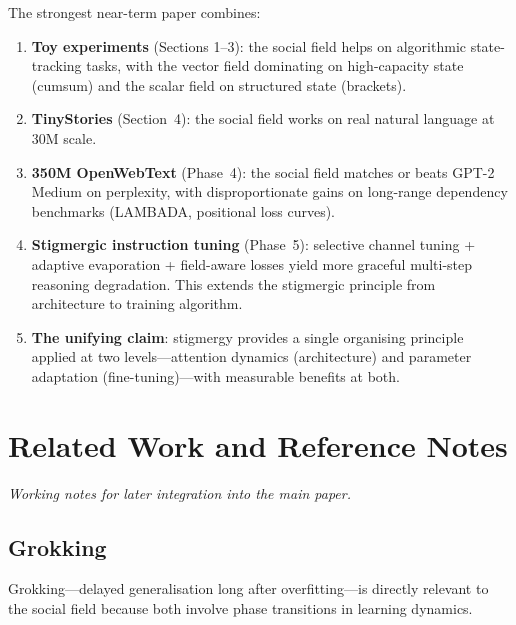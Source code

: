 \documentclass[11pt,a4paper]{article}
\begin{document}
The strongest near-term paper combines:
\begin{enumerate}
    \item \textbf{Toy experiments} (Sections 1--3): the social field
          helps on algorithmic state-tracking tasks, with the vector
          field dominating on high-capacity state (cumsum) and the
          scalar field on structured state (brackets).
    \item \textbf{TinyStories} (Section~4): the social field works on
          real natural language at 30M scale.
    \item \textbf{350M OpenWebText} (Phase~4): the social field
          matches or beats GPT-2 Medium on perplexity, with
          disproportionate gains on long-range dependency benchmarks
          (LAMBADA, positional loss curves).
    \item \textbf{Stigmergic instruction tuning} (Phase~5): selective
          channel tuning + adaptive evaporation + field-aware losses
          yield more graceful multi-step reasoning degradation.  This
          extends the stigmergic principle from architecture to
          training algorithm.
    \item \textbf{The unifying claim}: stigmergy provides a single
          organising principle applied at two levels---attention
          dynamics (architecture) and parameter adaptation
          (fine-tuning)---with measurable benefits at both.
\end{enumerate}



\section{Related Work and Reference Notes}

\emph{Working notes for later integration into the main paper.}

\subsection{Grokking}

Grokking---delayed generalisation long after overfitting---is directly
relevant to the social field because both involve phase transitions in
learning dynamics.
\end{document}
